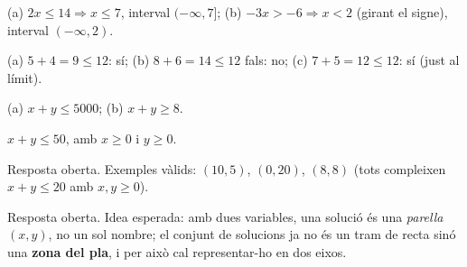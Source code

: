 \begin{solucions}
\begin{sollist}
  \item (a) $2x\le 14 \Rightarrow x\le 7$, interval $(-\infty,7]$; \quad
        (b) $-3x>-6 \Rightarrow x<2$ (girant el signe), interval $(-\infty,2)$.
  \item (a) $5+4=9\le 12$: sí; \quad (b) $8+6=14\le 12$ fals: no; \quad
        (c) $7+5=12\le 12$: sí (just al límit).
  \item (a) $x+y\le\num{5000}$; \quad (b) $x+y\ge 8$.
  \item $x+y\le 50$, amb $x\ge 0$ i $y\ge 0$.
  \item Resposta oberta. Exemples vàlids: $(10,5)$, $(0,20)$, $(8,8)$ (tots compleixen
        $x+y\le 20$ amb $x,y\ge 0$).
  \item Resposta oberta. Idea esperada: amb dues variables, una solució és una
        \emph{parella} $(x,y)$, no un sol nombre; el conjunt de solucions ja no és un
        tram de recta sinó una \textbf{zona del pla}, i per això cal representar-ho en
        dos eixos.
\end{sollist}
\end{solucions}
